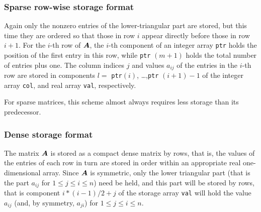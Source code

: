 \documentclass{galahad}
\begin{document}
\subsubsection{Sparse row-wise storage format}\label{rowwise}
Again only the nonzero entries of the lower-triangular part are stored,
but this time they are ordered so that those in row $i$ appear directly
before those in row $i+1$. For the $i$-th row of ${\bm{A}}$, the $i$-th component
of an integer array {\tt ptr} holds the position of the first entry in this row,
while {\tt ptr} $(m+1)$ holds the total number of entries plus one.
The column indices $j$ and values $a_{ij}$ of the entries in the $i$-th row
are stored in components
$l =$ {\tt ptr}$(i)$, \ldots ,{\tt ptr} $(i+1)-1$ of the
integer array {\tt col}, and real array {\tt val}, respectively.

For sparse matrices, this scheme almost always requires less storage than
its predecessor.

\subsubsection{Dense storage format}\label{dense}
The matrix ${\bm{A}}$ is stored as a compact
dense matrix by rows, that is, the values of the entries of each row in turn are
stored in order within an appropriate real one-dimensional array.
Since ${\bm{A}}$ is symmetric, only the lower triangular part (that is the part
$a_{ij}$ for $1 \leq j \leq i \leq n$) need be held, and this part will be
stored by rows, that is component
$i \ast (i-1)/2 + j$ of the storage array {\tt val}
will hold the value $a_{ij}$ (and, by symmetry, $a_{ji}$)
for $1 \leq j \leq i \leq n$.








\end{document}
